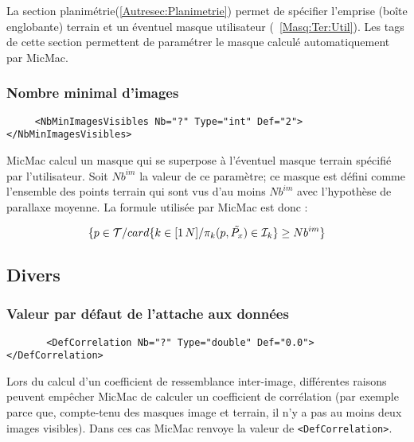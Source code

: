 \label{MEC:Masq}

La section planim\'etrie(\ref{Autresec:Planimetrie}) permet
de sp\'ecifier l'emprise (bo\^ite englobante) terrain  et un
\'eventuel masque utilisateur (~\ref{Masq:Ter:Util}).
Les tags de cette section permettent de param\'etrer le
masque calcul\'e automatiquement par MicMac.


\subsubsection{Nombre minimal d'images}

\begin{verbatim}
     <NbMinImagesVisibles Nb="?" Type="int" Def="2"> </NbMinImagesVisibles>
\end{verbatim}



MicMac calcul un masque qui se superpose \`a l'\'eventuel
masque terrain sp\'ecifi\'e par l'utilisateur.
Soit $Nb^{im}$ la valeur de ce param\`etre;
ce masque est d\'efini comme l'ensemble des points
terrain qui sont vus d'au moins $Nb^{im}$ avec l'hypoth\`ese
de parallaxe moyenne. La formule utilis\'ee par MicMac
est donc :


\begin{equation}
        \{p\in\mathcal T / card\{k\in[1 \, N]/ \pi_{k}(p,\tilde{P_x}) \in {\mathcal I}_k\} \geq Nb^{im}\}
\end{equation}



\subsection{Divers}
\subsubsection{Valeur par d\'efaut de l'attache aux donn\'ees}

\begin{verbatim}
       <DefCorrelation Nb="?" Type="double" Def="0.0"> </DefCorrelation>
\end{verbatim}

Lors du calcul d'un coefficient de ressemblance inter-image,
diff\'erentes raisons peuvent emp\^echer MicMac de calculer un
coefficient de corr\'elation (par exemple  parce que, compte-tenu
des masques image et terrain, il n'y a pas au moins deux images visibles).
Dans ces cas MicMac renvoye la valeur de {\tt <DefCorrelation>}.

